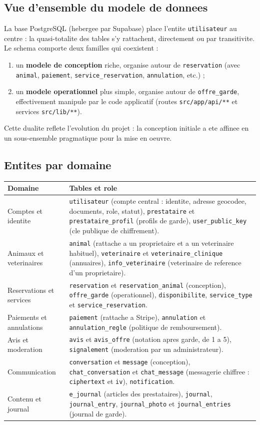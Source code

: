 \documentclass[11pt,a4paper]{article}
\begin{document}
\subsection{Vue d'ensemble du modele de donnees}
La base PostgreSQL (hebergee par Supabase) place l'entite \texttt{utilisateur} au
centre : la quasi-totalite des tables s'y rattachent, directement ou par
transitivite. Le schema comporte deux familles qui coexistent :
\begin{enumerate}[leftmargin=1.6em]
  \item un \textbf{modele de conception} riche, organise autour de \texttt{reservation} (avec \texttt{animal}, \texttt{paiement}, \texttt{service\_reservation}, \texttt{annulation}, etc.) ;
  \item un \textbf{modele operationnel} plus simple, organise autour de \texttt{offre\_garde}, effectivement manipule par le code applicatif (routes \texttt{src/app/api/**} et services \texttt{src/lib/**}).
\end{enumerate}
Cette dualite reflete l'evolution du projet : la conception initiale a ete
affinee en un sous-ensemble pragmatique pour la mise en oeuvre.

\subsection{Entites par domaine}
\begin{tabularx}{\linewidth}{@{}lX@{}}
\toprule
\textbf{Domaine} & \textbf{Tables et role} \\
\midrule
Comptes et identite & \texttt{utilisateur} (compte central : identite, adresse geocodee, documents, role, statut), \texttt{prestataire} et \texttt{prestataire\_profil} (profils de garde), \texttt{user\_public\_key} (cle publique de chiffrement). \\
Animaux et veterinaires & \texttt{animal} (rattache a un proprietaire et a un veterinaire habituel), \texttt{veterinaire} et \texttt{veterinaire\_clinique} (annuaires), \texttt{info\_veterinaire} (veterinaire de reference d'un proprietaire). \\
Reservations et services & \texttt{reservation} et \texttt{reservation\_animal} (conception), \texttt{offre\_garde} (operationnel), \texttt{disponibilite}, \texttt{service\_type} et \texttt{service\_reservation}. \\
Paiements et annulations & \texttt{paiement} (rattache a Stripe), \texttt{annulation} et \texttt{annulation\_regle} (politique de remboursement). \\
Avis et moderation & \texttt{avis} et \texttt{avis\_offre} (notation apres garde, de 1 a 5), \texttt{signalement} (moderation par un administrateur). \\
Communication & \texttt{conversation} et \texttt{message} (conception), \texttt{chat\_conversation} et \texttt{chat\_message} (messagerie chiffree : \texttt{ciphertext} et \texttt{iv}), \texttt{notification}. \\
Contenu et journal & \texttt{e\_journal} (articles des prestataires), \texttt{journal}, \texttt{journal\_entry}, \texttt{journal\_photo} et \texttt{journal\_entries} (journal de garde). \\
\bottomrule
\end{tabularx}
\end{document}
